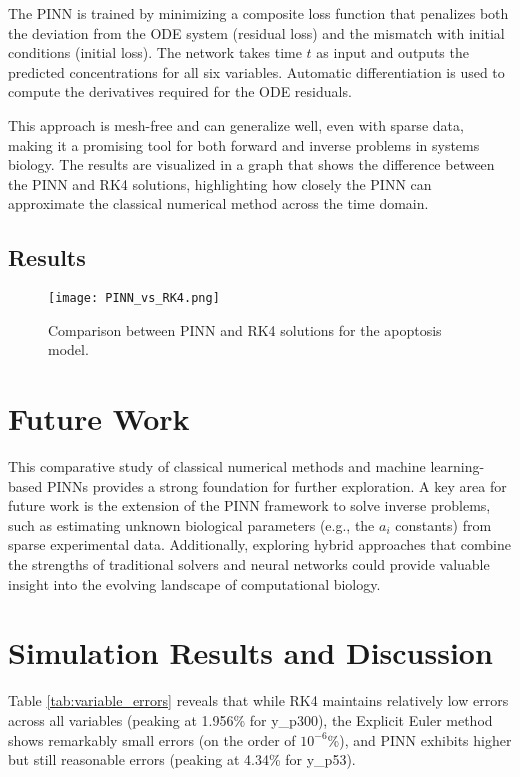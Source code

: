 \documentclass[conference]{IEEEtran}
\begin{document}
The PINN is trained by minimizing a composite loss function that penalizes both the deviation from the ODE system (residual loss) and the mismatch with initial conditions (initial loss). The network takes time $t$ as input and outputs the predicted concentrations for all six variables. Automatic differentiation is used to compute the derivatives required for the ODE residuals.

This approach is mesh-free and can generalize well, even with sparse data, making it a promising tool for both forward and inverse problems in systems biology. The results are visualized in a graph that shows the difference between the PINN and RK4 solutions, highlighting how closely the PINN can approximate the classical numerical method across the time domain.

\subsection{Results}
\begin{figure}[htbp]
\centerline{\texttt{[image: PINN\_vs\_RK4.png]}}
\caption{Comparison between PINN and RK4 solutions for the apoptosis model.}
\label{fig:pinn_vs_rk4}
\end{figure}

\section{Future Work}
This comparative study of classical numerical methods and machine learning-based PINNs provides a strong foundation for further exploration. A key area for future work is the extension of the PINN framework to solve inverse problems, such as estimating unknown biological parameters (e.g., the $a_i$ constants) from sparse experimental data. Additionally, exploring hybrid approaches that combine the strengths of traditional solvers and neural networks could provide valuable insight into the evolving landscape of computational biology.

\section{Simulation Results and Discussion}
Table \ref{tab:variable_errors} reveals that while RK4 maintains relatively low errors across all variables (peaking at 1.956\% for y\_p300), the Explicit Euler method shows remarkably small errors (on the order of $10^{-6}$\%), and PINN exhibits higher but still reasonable errors (peaking at 4.34\% for y\_p53). 
\end{document}
